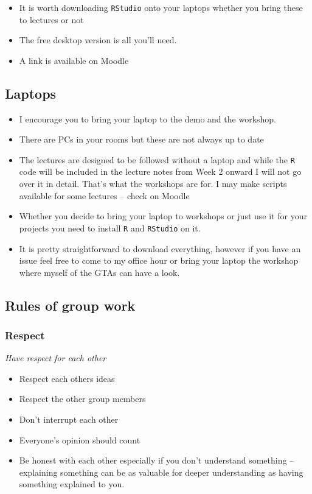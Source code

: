 \documentclass[
]{gitbook}
\providecommand{\tightlist}{%
  \setlength{\itemsep}{0pt}\setlength{\parskip}{0pt}}
\begin{document}
\begin{itemize}
\tightlist
\item
  It is worth downloading \texttt{RStudio} onto your laptops whether you bring these to lectures or not
\item
  The free desktop version is all you'll need.
\item
  A link is available on Moodle
\end{itemize}

\hypertarget{laptops}{%
\subsection{Laptops}\label{laptops}}

\begin{itemize}
\tightlist
\item
  I encourage you to bring your laptop to the demo and the workshop.
\item
  There are PCs in your rooms but these are not always up to date
\item
  The lectures are designed to be followed without a laptop and while the \texttt{R} code will be included in the lecture notes from Week 2 onward I will not go over it in detail. That's what the workshops are for. I may make scripts available for some lectures -- check on Moodle
\item
  Whether you decide to bring your laptop to workshops or just use it for your projects you need to install \texttt{R} and \texttt{RStudio} on it.
\item
  It is pretty straightforward to download everything, however if you have an issue feel free to come to my office hour or bring your laptop the workshop where myself of the GTAs can have a look.
\end{itemize}

\hypertarget{rules-of-group-work}{%
\subsection{Rules of group work}\label{rules-of-group-work}}

\hypertarget{respect}{%
\subsubsection{Respect}\label{respect}}

\emph{Have respect for each other}

\begin{itemize}
\tightlist
\item
  Respect each others ideas
\item
  Respect the other group members
\item
  Don't interrupt each other
\item
  Everyone's opinion should count
\item
  Be honest with each other especially if you don't understand something -- explaining something can be as valuable for deeper understanding as having something explained to you.
\end{itemize}
\end{document}
